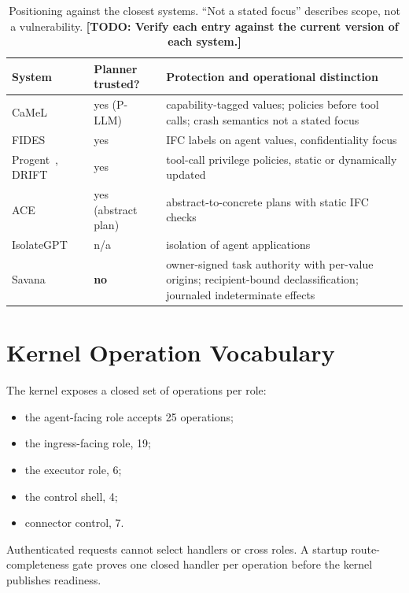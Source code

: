 \documentclass[letterpaper,twocolumn,10pt]{article}
\newcommand{\sys}{Savana}
\newcommand{\todo}[1]{{\color{red}\textbf{[TODO: #1]}}}
\begin{document}
\begin{table}[h]
\centering\footnotesize
\begin{tabularx}{\columnwidth}{@{}p{}p{}X@{}}
\toprule
\textbf{System} & \textbf{Planner trusted?} & \textbf{Protection and operational distinction}\\
\midrule
CaMeL~\cite{debenedetti2025camel} & yes (P-LLM) & capability-tagged values; policies before tool calls; crash semantics not a stated focus\\
FIDES~\cite{costa2025fides} & yes & IFC labels on agent values, confidentiality focus\\
Progent~\cite{shi2025progent}, DRIFT~\cite{li2025drift} & yes & tool-call privilege policies, static or dynamically updated\\
ACE~\cite{ace2026} & yes (abstract plan) & abstract-to-concrete plans with static IFC checks\\
IsolateGPT~\cite{wu2025isolategpt} & n/a & isolation of agent applications\\
\sys{} & \textbf{no} & owner-signed task authority with per-value origins; recipient-bound declassification; journaled indeterminate effects\\
\bottomrule
\end{tabularx}
\caption{Positioning against the closest systems. ``Not a stated focus''
describes scope, not a vulnerability. \todo{Verify each entry against the
current version of each system.}}
\label{tab:related-comparison}
\end{table}

\section{Kernel Operation Vocabulary}
\label{app:ops}

The kernel exposes a closed set of operations per role:
\begin{itemize}
\item the agent-facing role accepts 25 operations;
\item the ingress-facing role, 19;
\item the executor role, 6;
\item the control shell, 4;
\item connector control, 7.
\end{itemize}
Authenticated requests cannot select handlers or cross roles. A startup
route-completeness gate proves one closed handler per operation before the
kernel publishes readiness.
\end{document}
